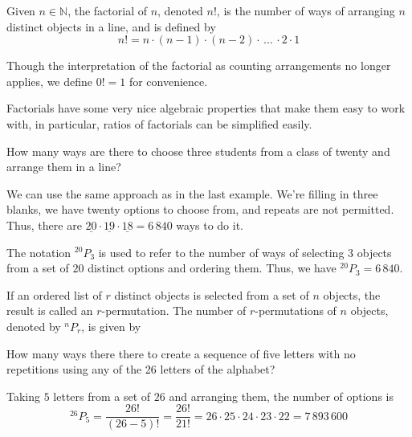 \par
\begin{defn}
Given $n \in \mathbb{N}$, the factorial of $n$, denoted $n!$, is the number of ways of arranging $n$ distinct objects in a line, and is defined by
$$n! = n \cdot (n-1) \cdot (n-2) \cdot \, ... \, \cdot 2 \cdot 1$$
\end{defn}
\begin{rmk} Though the interpretation of the factorial as counting arrangements no longer applies, we define $0!=1$ for convenience.
\end{rmk}
\par Factorials have some very nice algebraic properties that make them easy to work with, in particular, ratios of factorials can be simplified easily.
\par
\begin{examp}
How many ways are there to choose three students from a class of twenty and arrange them in a line?
\par
\noindent We can use the same approach as in the last example. We're filling in three blanks, we have twenty options to choose from, and repeats are not permitted. Thus, there are $\underline{20} \cdot \underline{19} \cdot \underline{18} = 6\,840$ ways to do it. 
\par
\noindent The notation $^{20}P_3$ is used to refer to the number of ways of selecting $3$ objects from a set of $20$ distinct options and ordering them. Thus, we have $^{20}P_3 = 6\,840$.
\end{examp}
\par
\begin{definition}\label{permutationdefinition}
If an ordered list of $r$ distinct objects is selected from a set of $n$ objects, the result is called an $r$-permutation. The number of $r$-permutations of $n$ objects, denoted by $^{n}P_r$, is given by
\end{definition}
\par
\begin{examp}
How many ways there there to create a sequence of five letters with no repetitions using any of the 26 letters of the alphabet?
\par
\noindent Taking $5$ letters from a set of $26$ and arranging them, the number of options is
$$^{26}P_5 = \frac{26!}{(26-5)!} = \frac{26!}{21!} = 26 \cdot 25 \cdot 24 \cdot 23 \cdot 22 = 7\,893\,600$$
\end{examp}


